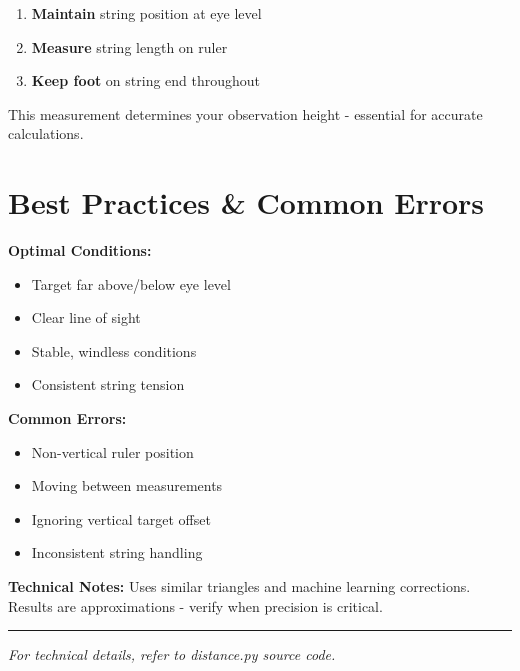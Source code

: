 \documentclass[11pt,a4paper]{article}
\begin{document}
\begin{multicols}{2}
    \columnbreak
    
    \begin{enumerate}[noitemsep]
        \item \textbf{Maintain} string position at eye level
        \item \textbf{Measure} string length on ruler
        \item \textbf{Keep foot} on string end throughout
    \end{enumerate}
    
    This measurement determines your observation height - essential for accurate calculations.
\end{multicols}
\newpage    

\section{Best Practices \& Common Errors}

\begin{multicols}{2}
    \textbf{Optimal Conditions:}
    \begin{itemize}[noitemsep]
        \item Target far above/below eye level
        \item Clear line of sight
        \item Stable, windless conditions
        \item Consistent string tension
    \end{itemize}
    
    \columnbreak
    
    \textbf{Common Errors:}
    \begin{itemize}[noitemsep]
        \item Non-vertical ruler position
        \item Moving between measurements
        \item Ignoring vertical target offset
        \item Inconsistent string handling
    \end{itemize}
\end{multicols}

\vspace{0.5cm}
\textbf{Technical Notes:} Uses similar triangles and machine learning corrections. Results are approximations - verify when precision is critical.

\vspace{0.5cm}
\hrule
\vspace{0.3cm}
\textit{For technical details, refer to distance.py source code.}
\end{document}
